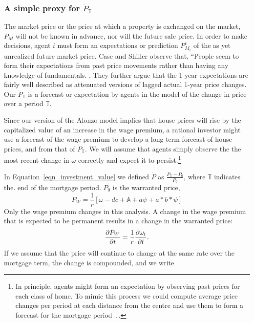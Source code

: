 \subsubsection{A simple proxy for $\dot P_\mathbb{T}$}

The \gls{market price} or the price at which a property is exchanged on the market, $P_M$ will not be known in advance, nor will the future sale price.  In order to make decisions, agent $i$ must form an \glspl{expectation} or prediction $P_{M_i}^{\epsilon}$ of the as yet unrealized future market price. Case and Shiller observe that, ``People seem to form their expectations from past price movements rather than having any knowledge of fundamentals. \cite{caseThereBubbleHousing2003}. They further argue that the 1-year expectations are fairly well described as attenuated versions of lagged actual 1-year price changes. Our $\dot P_\mathbb{T}$ is a forecast or expectation by agents in the model of the change in price over a period $\mathbb{T}$.

Since our version of the \gls{Alonzo model} implies that house prices will rise by the capitalized value of an increase in the wage premium, a rational investor might use a forecast of the wage premium to develop a long-term forecast of house prices, and from that of $\dot P_\mathbb{T}$. %
We will assume that agents simply observe the the most recent change in $\omega$  correctly and expect it to persist.\footnote{In principle, agents might form an expectation by observing past prices for each class of home. To mimic this process we could compute average price changes per period at each distance from the centre and use them to form a forecast for the mortgage period $\mathbb{T}$. }

In Equation~\ref{eqn_investment_value} we defined $\dot P$ as $\frac{P_\mathbb{T}-P_0}{P_0} $, where $\mathbb{T}$ indicates the. end of the mortgage period. $P_0$ is the warranted price, 
\[P_W =\frac{1}{r}\left[\omega - {dc} + \mathbb{A} + a\psi\nonumber  + a*b*\psi\right]\]
Only the wage premium changes in this analysis. A change in the wage premium that is expected to be permanent results in a change in the warranted price:  \[\frac{\partial P_W}{\partial t} = \frac{1}{r}\frac{\partial \omega_t}{\partial t}.\]
If we assume that the price will continue to change at the same rate over the mortgage term, the change is compounded, and we write

